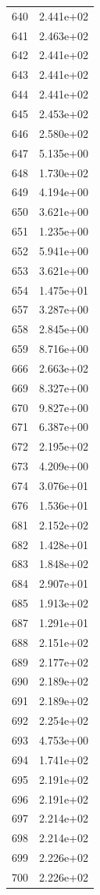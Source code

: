 \documentclass[12pt]{article}
\begin{document}
\begin{longtable}{@{}cc@{}}
640 & 2.441e+02 \\
641 & 2.463e+02 \\
642 & 2.441e+02 \\
643 & 2.441e+02 \\
644 & 2.441e+02 \\
645 & 2.453e+02 \\
646 & 2.580e+02 \\
647 & 5.135e+00 \\
648 & 1.730e+02 \\
649 & 4.194e+00 \\
650 & 3.621e+00 \\
651 & 1.235e+00 \\
652 & 5.941e+00 \\
653 & 3.621e+00 \\
654 & 1.475e+01 \\
657 & 3.287e+00 \\
658 & 2.845e+00 \\
659 & 8.716e+00 \\
666 & 2.663e+02 \\
669 & 8.327e+00 \\
670 & 9.827e+00 \\
671 & 6.387e+00 \\
672 & 2.195e+02 \\
673 & 4.209e+00 \\
674 & 3.076e+01 \\
676 & 1.536e+01 \\
681 & 2.152e+02 \\
682 & 1.428e+01 \\
683 & 1.848e+02 \\
684 & 2.907e+01 \\
685 & 1.913e+02 \\
687 & 1.291e+01 \\
688 & 2.151e+02 \\
689 & 2.177e+02 \\
690 & 2.189e+02 \\
691 & 2.189e+02 \\
692 & 2.254e+02 \\
693 & 4.753e+00 \\
694 & 1.741e+02 \\
695 & 2.191e+02 \\
696 & 2.191e+02 \\
697 & 2.214e+02 \\
698 & 2.214e+02 \\
699 & 2.226e+02 \\
700 & 2.226e+02 \\

\end{longtable}
\end{document}
